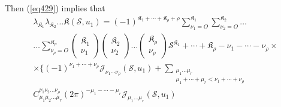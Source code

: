 Then (\ref{eq429}) implies that 
\begin{gather*}
\lambda_{\mathfrak{K}_1}   \lambda_{\mathfrak{K}_2} \ldots
\mathfrak{K}(\mathscr{S},u_1) = (-1)^{\mathfrak{K}_1 + \cdots +
  \mathfrak{K}_\rho + \rho} \sum_{\nu_1 = O}^{\mathfrak{K}_1}
\sum_{\nu_2 = O}^{\mathfrak{K}_2} \ldots\\ 
\ldots \sum_{\nu_\rho =
  O}^{\mathfrak{K}_\rho} \begin{pmatrix}\mathfrak{K}_1
  \\ \nu_1 \end{pmatrix}\begin{pmatrix}\mathfrak{K}_2
  \\ \nu_2 \end{pmatrix} \ldots \begin{pmatrix}\mathfrak{K}_\rho
  \\ \nu_\rho \end{pmatrix}   \mathscr{S}^{\mathfrak{K}_1} + \cdots +
\mathfrak{K}_\rho - \nu_1 - \cdots -\nu_\rho   \times \\ 
\times   \big\{ (-1)^{\nu_1 + \cdots + \nu_\rho}   \mathcal{J}_{\nu_1
  \cdots \nu_\rho}   (\mathscr{S},u_1) + \sum_{\substack{\mu_1 \ldots
    \mu_{r} \\ \mu_1 + \cdots + \mu_r    <   \nu_1 + \cdots +
    \nu_\rho}}   \\[4pt]
C^{\nu_1 \nu_2 \ldots \nu_\rho}_{\mu_1 \mu_2 \ldots
  \mu_r}   (2\pi)^{-\mu_1 - \cdots - \mu_r}   \mathcal{J}_{\mu_1
  \ldots \mu_r}   (\mathscr{S},u_1) \tag{432}\label{eq432} 
\end{gather*}


